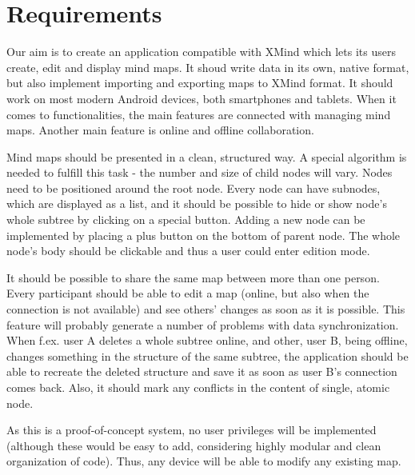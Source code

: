 %
%
%
%
%

\section{Requirements}
\label{sec:requirements}

Our aim is to create an application compatible with XMind which lets its users create, edit and display mind maps. It shoud write data in its own, native format, but also implement importing and exporting maps to XMind format. It should work on most modern Android devices, both smartphones and tablets. When it comes to functionalities, the main features are connected with managing mind maps. Another main feature is online and offline collaboration. 

Mind maps should be presented in a clean, structured way. A special algorithm is needed to fulfill this task - the number and size of child nodes will vary. Nodes need to be positioned around the root node. Every node can have subnodes, which are displayed as a list, and it should be possible to hide or show node's whole subtree by clicking on a special button. Adding a new node can be implemented by placing a plus button on the bottom of parent node. The whole node's body should be clickable and thus a user could enter edition mode.

It should be possible to share the same map between more than one person. Every participant should be able to edit a map (online, but also when the connection is not available) and see others' changes as soon as it is possible. This feature will probably generate a number of problems with data synchronization. When f.ex. user A deletes a whole subtree online, and other, user B, being offline, changes something in the structure of the same subtree, the application should be able to recreate the deleted structure and save it as soon as user B's connection comes back. Also, it should mark any conflicts in the content of single, atomic node. 

As this is a proof-of-concept system, no user privileges will be implemented (although these would be easy to add, considering highly modular and clean organization of code). Thus, any device will be able to modify any existing map.

